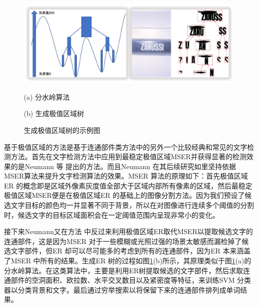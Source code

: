     \begin{figure}[!h]
    \centering
    \includegraphics[width=\textwidth]{./figures/c2_er_tree.jpg}
    \begin{minipage}[t]{0.48\linewidth}
    \centerline{ \small (a) 分水岭算法}
    \end{minipage}
    \begin{minipage}[t]{0.48\linewidth}
    \centerline{ \small (b) 生成极值区域树}
    \end{minipage}
    \caption{生成极值区域树的示例图}
    \label{fig.c2_er_tree}
    \end{figure}

    基于极值区域的方法是基于连通部件类方法中的另外一个比较经典和常见的文字检测方法。首先在文字检测方法中应用到最稳定极值区域MSER并获得显著的检测效果的是Neumann 等\cite{Neumann2010A} 提出的方法。而且Neumann 在其后续研究如\cite{Neumann2011Text}里坚持依据MSER算法来提升文字检测算法的效果。MSER 算法的原理如下：首先极值区域ER 的概念即是区域外像素灰度值全部大于区域内部所有像素的区域，然后最稳定极值区域MSER便是在极值区域ER 的基础上的图像分割方法。因为我们预设了候选文字目标的颜色均一并显著不同于背景，所以在对图像进行连续多个阈值的分割时，候选文字的目标区域面积会在一定阈值范围内呈现非常小的变化。

    接下来Neumann又在方法\cite{Neumann2012Real} 中反过来利用极值区域ER取代MSER以提取候选文字的连通部件，这是因为MSER 对于一些模糊或光照过强的场景太敏感而漏检掉了候选文字部件，但ER 却可以尽可能多的考虑到所有的连通部件，因为ER 本来涵盖了MSER 中所有的结果。生成ER 树的过程如图\ref{fig.c2_er_tree}(b)所示，其原理类似于图\ref{fig.c2_er_tree}(a)的分水岭算法。在这类算法中，主要是利用ER树提取候选的文字部件，然后求取连通部件的空洞面积、欧拉数、水平交叉数目以及紧密度等特征，来训练SVM 分类器以分类背景和文字。最后通过穷举搜索以将保留下来的连通部件排列成单词结果。

